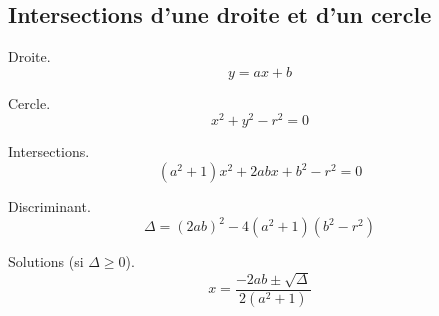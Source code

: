 \documentclass[12pt]{article}
\begin{document}
\subsection*{Intersections d'une droite et d'un cercle}

\bigskip
Droite.
\[ y = ax + b \]

\medskip
Cercle.
\[ x^2 + y^2 - r^2 = 0 \]

\medskip
Intersections.
\[ (a^2 + 1)x^2 + 2abx + b^2 - r^2 = 0 \]

\medskip
Discriminant.
\[ \Delta = (2ab)^2 - 4(a^2 + 1)(b^2 - r^2) \]

\medskip
Solutions (si \( \Delta \geq 0 \)).
\[ x = \frac{-2ab \pm \sqrt{\Delta}}{2(a^2 + 1)} \]

\medskip
\begin{flushright}
\color{blue}
\small\LuaLaTeX
\end{flushright}
\end{document}
